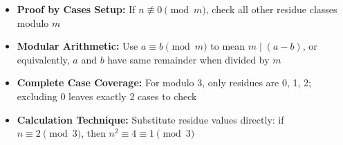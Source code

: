 \begin{takeaways}
\begin{itemize}
\item \textbf{Proof by Cases Setup:} If $n \not\equiv 0 \pmod{m}$, check all other residue classes modulo $m$
\item \textbf{Modular Arithmetic:} Use $a \equiv b \pmod{m}$ to mean $m \mid (a-b)$, or equivalently, $a$ and $b$ have same remainder when divided by $m$
\item \textbf{Complete Case Coverage:} For modulo 3, only residues are 0, 1, 2; excluding 0 leaves exactly 2 cases to check
\item \textbf{Calculation Technique:} Substitute residue values directly: if $n \equiv 2 \pmod{3}$, then $n^2 \equiv 4 \equiv 1 \pmod{3}$
\end{itemize}
\end{takeaways}

